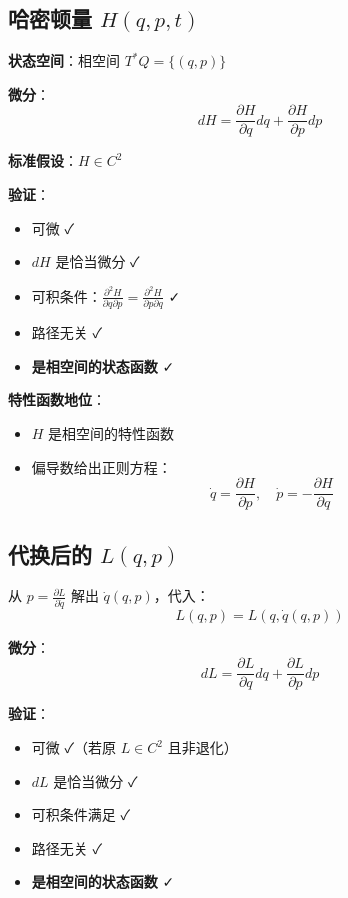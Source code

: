 \documentclass[12pt,a4paper]{article}
\begin{document}
\subsection{哈密顿量 $H(q, p, t)$}

\textbf{状态空间}：相空间 $T^*Q = \{(q, p)\}$

\textbf{微分}：
\begin{equation}
dH = \frac{\partial H}{\partial q}dq + \frac{\partial H}{\partial p}dp
\end{equation}

\textbf{标准假设}：$H \in C^2$

\textbf{验证}：
\begin{itemize}
\item 可微 ✓
\item $dH$ 是恰当微分 ✓
\item 可积条件：$\frac{\partial^2 H}{\partial q \partial p} = \frac{\partial^2 H}{\partial p \partial q}$ ✓
\item 路径无关 ✓
\item \textbf{是相空间的状态函数} ✓
\end{itemize}

\textbf{特性函数地位}：
\begin{itemize}
\item $H$ 是相空间的特性函数
\item 偏导数给出正则方程：
\begin{equation}
\dot{q} = \frac{\partial H}{\partial p}, \quad \dot{p} = -\frac{\partial H}{\partial q}
\end{equation}
\end{itemize}

\subsection{代换后的 $L(q, p)$}

从 $p = \frac{\partial L}{\partial \dot{q}}$ 解出 $\dot{q}(q, p)$，代入：
\begin{equation}
L(q, p) = L(q, \dot{q}(q, p))
\end{equation}

\textbf{微分}：
\begin{equation}
dL = \frac{\partial L}{\partial q}dq + \frac{\partial L}{\partial p}dp
\end{equation}

\textbf{验证}：
\begin{itemize}
\item 可微 ✓（若原 $L \in C^2$ 且非退化）
\item $dL$ 是恰当微分 ✓
\item 可积条件满足 ✓
\item 路径无关 ✓
\item \textbf{是相空间的状态函数} ✓
\end{itemize}
\end{document}
